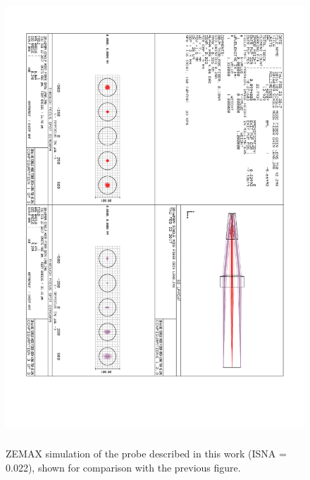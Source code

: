 \begin{figure}[h!]\centering \includegraphics[height=17cm,angle=90,origin=c]{appendix/ZEMAXlow.pdf}
      \caption{ZEMAX simulation of the probe described in this work (ISNA = 0.022), shown for comparison with the previous figure.}
\end{figure}

%
%
